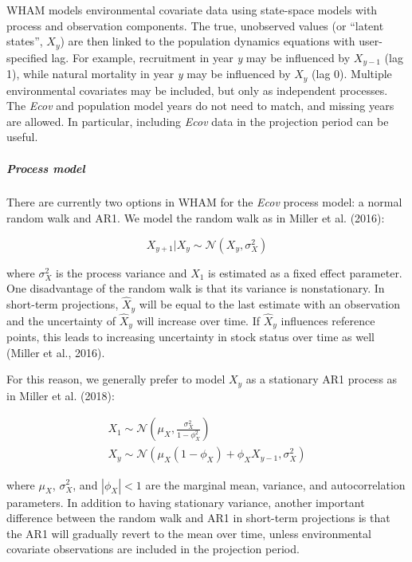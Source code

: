 \documentclass[]{article}
\let\oldsubparagraph\subparagraph
\renewcommand{\subparagraph}[1]{\oldsubparagraph{#1}\mbox{}}
\begin{document}
WHAM models environmental covariate data using state-space models with
process and observation components. The true, unobserved values (or
``latent states'', \(X_y\)) are then linked to the population dynamics
equations with user-specified lag. For example, recruitment in year
\emph{y} may be influenced by \(X_{y-1}\) (lag 1), while natural
mortality in year \emph{y} may be influenced by \(X_y\) (lag 0).
Multiple environmental covariates may be included, but only as
independent processes. The \emph{Ecov} and population model years do not
need to match, and missing years are allowed. In particular, including
\emph{Ecov} data in the projection period can be useful.

\hypertarget{process-model}{%
\subparagraph{Process model}\label{process-model}}

There are currently two options in WHAM for the \emph{Ecov} process
model: a normal random walk and AR1. We model the random walk as in
Miller et al. (2016):

\[X_{y+1} | X_y \sim \mathcal{N}\left( X_y, \sigma^2_X\right)\]

where \(\sigma^2_X\) is the process variance and \(X_1\) is estimated as
a fixed effect parameter. One disadvantage of the random walk is that
its variance is nonstationary. In short-term projections, \(\hat{X}_y\)
will be equal to the last estimate with an observation and the
uncertainty of \(\hat{X}_y\) will increase over time. If \(\hat{X}_y\)
influences reference points, this leads to increasing uncertainty in
stock status over time as well (Miller et al., 2016).

For this reason, we generally prefer to model \(X_y\) as a stationary
AR1 process as in Miller et al. (2018):

\begin{equation}
  \begin{array}{cc}
    X_1 \sim \mathcal{N} \left( \mu_X, \frac{\sigma^2_X}{1-\phi^2_X} \right) \\
    X_y \sim \mathcal{N} \left( \mu_X(1-\phi_X) + \phi_X X_{y-1}, \sigma^2_X \right)
  \end{array}
\end{equation}

where \(\mu_X\), \(\sigma^2_X\), and \(|\phi_X| < 1\) are the marginal
mean, variance, and autocorrelation parameters. In addition to having
stationary variance, another important difference between the random
walk and AR1 in short-term projections is that the AR1 will gradually
revert to the mean over time, unless environmental covariate
observations are included in the projection period.
\end{document}
